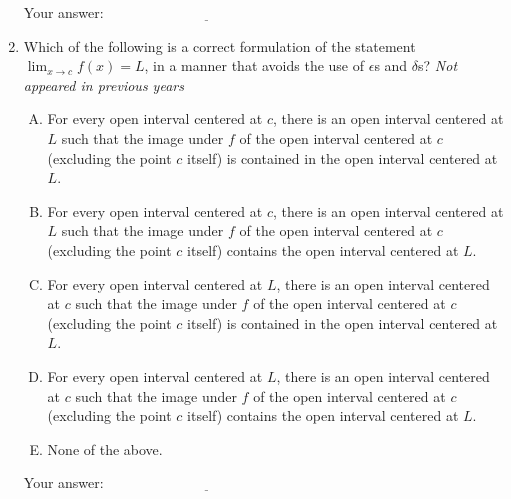 \documentclass[10pt]{amsart}
\begin{document}
\begin{enumerate}
  \vspace{0.1in}
  Your answer: $\underline{\qquad\qquad\qquad\qquad\qquad\qquad\qquad}$
  \vspace{0.5in}

\item Which of the following is a correct formulation of the statement
  $\lim_{x \to c} f(x) = L$, in a manner that avoids the use of
  $\epsilon$s and $\delta$s? {\em Not appeared in previous years}

  \begin{enumerate}[(A)]
  \item For every open interval centered at $c$, there is an open
    interval centered at $L$ such that the image under $f$ of the open
    interval centered at $c$ (excluding the point $c$ itself) is
    contained in the open interval centered at $L$.
  \item For every open interval centered at $c$, there is an open
    interval centered at $L$ such that the image under $f$ of the open
    interval centered at $c$ (excluding the point $c$ itself) contains
    the open interval centered at $L$.
  \item For every open interval centered at $L$, there is an open
    interval centered at $c$ such that the image under $f$ of the open
    interval centered at $c$ (excluding the point $c$ itself) is
    contained in the open interval centered at $L$.
  \item For every open interval centered at $L$, there is an open
    interval centered at $c$ such that the image under $f$ of the open
    interval centered at $c$ (excluding the point $c$ itself) contains
    the open interval centered at $L$.
  \item None of the above.
  \end{enumerate}

  \vspace{0.1in}
  Your answer: $\underline{\qquad\qquad\qquad\qquad\qquad\qquad\qquad}$
  \vspace{0.5in}

\end{enumerate}
\end{document}

